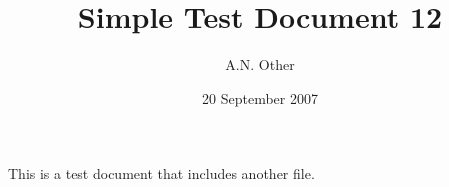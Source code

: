 \documentclass{article}
\date{20 September 2007}
\author{A.N. Other}
\title{Simple Test Document 12}
\begin{document}
\maketitle


This is a test document that includes another f{}ile.


%
\end{document}
